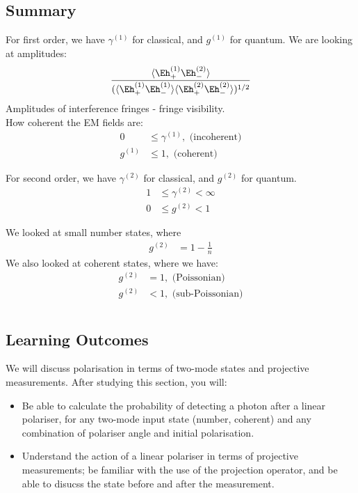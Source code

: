 \documentclass[a4paper, 11pt, normalem]{report}
\begin{document}
\section{Summary}
For first order, we have $\gamma^{(1)}$ for classical, and $g^{(1)}$ for quantum. We are looking at amplitudes:
\begin{align}
    \frac{\langle\Eh^{(1)}_+\Eh^{(2)}_-\rangle}{(\langle\Eh^{(1)}_+\Eh^{(1)}_-\rangle\langle\Eh^{(2)}_+\Eh^{(2)}_-\rangle)^{1/2}}
\end{align}
Amplitudes of interference fringes - fringe visibility. \\
How coherent the EM fields are:
\begin{align}
    0 &\leq \gamma^{(1)}, \text{ (incoherent)} \\
    g^{(1)} &\leq 1, \text{ (coherent)}
\end{align}

For second order, we have $\gamma^{(2)}$ for classical, and $g^{(2)}$ for quantum. 
\begin{align}
    1 &\leq \gamma^{(2)} < \infty \\
    0 &\leq g^{(2)} < 1
\end{align}

We looked at small number states, where 
\begin{align}
    g^{(2)} &= 1-\frac1n 
\end{align}
We also looked at coherent states, where we have:
\begin{align}
    g^{(2)} &= 1, \text{ (Poissonian)}\\
    g^{(2)} &< 1, \text{ (sub-Poissonian)} 
\end{align}

\chapter{}
\section{Learning Outcomes}
We will discuss polarisation in terms of two-mode states and projective measurements. 
After studying this section, you will:
\begin{itemize}
    \item Be able to calculate the probability of detecting a photon after a linear polariser, for any two-mode input state (number, coherent) and any combination of polariser angle and initial polarisation. 
    \item Understand the action of a linear polariser in terms of projective measurements; be familiar with the use of the projection operator, and be able to disucss the state before and after the measurement.
\end{itemize}
\end{document}
